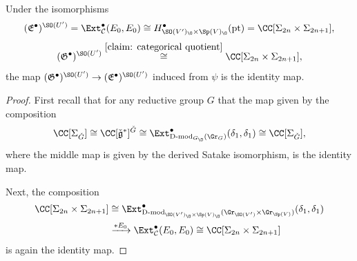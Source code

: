 \documentclass[11pt]{article}
\begin{document}
\begin{proposition}\label{prop: psi-inv}
    Under the isomorphisms $$(\mathfrak{E}^\bullet)^{\SO(U')} = \Ext^\bullet_{\mathcal{C}}(E_0, E_0)\cong H^\bullet_{\SO(V')_\O\times \Sp(V)_\O}(\mathrm{pt})=\CC[\Sigma_{2n}\times \Sigma_{2n+1}],$$
    $$(\mathfrak{G}^\bullet)^{\SO(U')}\stackrel{\ref{claim: categorical quotient}}{\cong} \CC[\Sigma_{2n}\times \Sigma_{2n+1}],$$
    the map $(\mathfrak{G}^\bullet)^{\SO(U')}\to (\mathfrak{E}^\bullet)^{\SO(U')}$ induced from $\psi$ is the identity map.
\end{proposition}
\begin{proof}
    First recall that for any reductive group $G$ that the map given by the composition
    $$\CC[\Sigma_{\check{G}}] \cong \CC[\mathfrak{\check{g}}^*]^{\check{G}}\cong \Ext^\bullet_{\operatorname{D-mod}_{G_\O}(\Gr_{G})}(\delta_1, \delta_1)\cong \CC[\Sigma_{\check{G}}],$$
    where the middle map is given by the derived Satake isomorphism, is the identity map.

    Next, the composition
    $$\begin{aligned}
        \CC[\Sigma_{2n}\times \Sigma_{2n+1}]&\cong \Ext^\bullet_{\operatorname{D-mod}_{\SO(V')_\O\times \Sp(V)_\O}(\Gr_{\SO(V')}\times \Gr_{\Sp(V)})}(\delta_1, \delta_1) \\&\xrightarrow{*E_0} \Ext^\bullet_{\mathcal{C}}(E_0, E_0)\cong \CC[\Sigma_{2n}\times \Sigma_{2n+1}]
    \end{aligned}$$ is again the identity map.


\end{proof}
\end{document}
